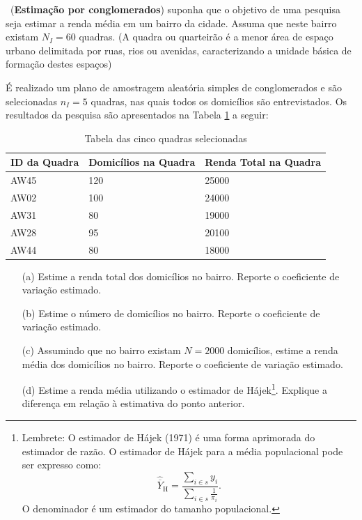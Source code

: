 \documentclass[a4paper,12pt,oneside,twocolumn]{Config/milktest}
\begin{document}
\medskip 
\question~({\bf Estimação por conglomerados}) suponha que o objetivo de uma pesquisa seja estimar a renda média em um bairro da cidade. Assuma que neste bairro existam \(N_I = 60\) quadras. {\scriptsize (A quadra ou quarteirão é a menor área de espaço urbano delimitada por ruas, rios ou avenidas, caracterizando a unidade básica de formação destes espaços)} 

É realizado um plano de amostragem aleatória simples de conglomerados e são selecionadas \(n_I = 5\) quadras, nas quais todos os domicílios são entrevistados. Os resultados da pesquisa são apresentados na Tabela \ref{tabela2} a seguir:

{\small \begin{table}[!htp]
\centering

\begin{tabular}{|p{2cm}|p{2cm}|p{2cm}|}
\hline
\textbf{ID da Quadra} & \textbf{Domicílios na Quadra} & \textbf{Renda Total na Quadra} \\ \hline
AW45 & 120 & 25000 \\ \hline
AW02 & 100 & 24000 \\ \hline
AW31 & 80  & 19000 \\ \hline
AW28 & 95  & 20100 \\ \hline
AW44 & 80  & 18000 \\ \hline
\end{tabular}
\caption{\label{tabela2}Tabela das cinco quadras selecionadas}
\end{table}
}
\begin{itemize}
    \item[(a)] Estime a renda total dos domicílios no bairro. Reporte o coeficiente de variação estimado.
    \item[(b)] Estime o número de domicílios no bairro. Reporte o coeficiente de variação estimado.
    \item[(c)] Assumindo que no bairro existam \(N = 2000\) domicílios, estime a renda média dos domicílios no bairro. Reporte o coeficiente de variação estimado.
    \item[(d)] Estime a renda média utilizando o estimador de Hájek\footnote{Lembrete: O estimador de Hájek (1971) é uma forma aprimorada do estimador de razão. O estimador de Hájek para a média populacional pode ser expresso como: \[
\widehat{\overline{Y}}_{\text{H}} = \frac{\sum_{i \in s} y_i}{\sum_{i \in s} \frac{1}{\pi_i}}.
\] O denominador é um estimador do tamanho populacional.}. Explique a diferença em relação à estimativa do ponto anterior. 
    
\end{itemize}

\bigskip


\centering\color{cor}{\scshape boa prova}
\end{document}
